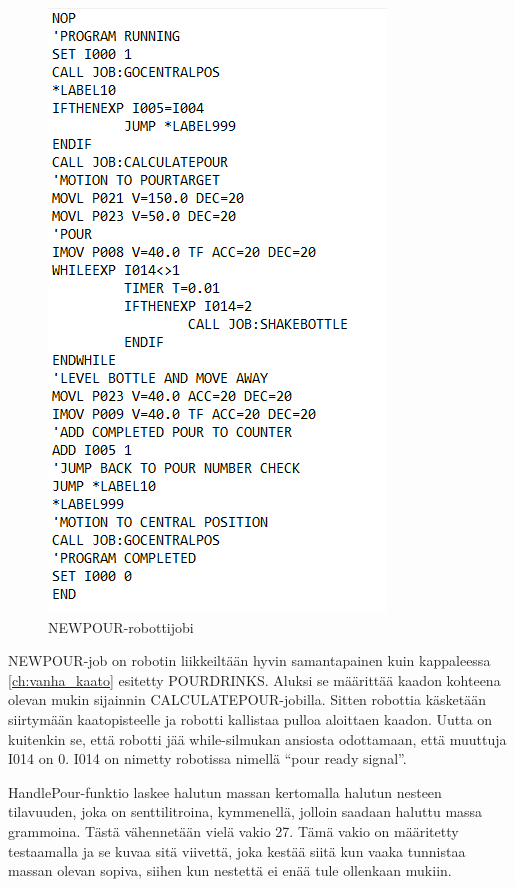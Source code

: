 \begin{figure}[h]
\begin{center}
\includegraphics[scale=0.8]{img/NEWPOUR.png}
\end{center}
\caption{NEWPOUR-robottijobi}
\label{fig:NEWPOUR}
\end{figure}

NEWPOUR-job on robotin liikkeiltään hyvin samantapainen kuin kappaleessa \ref{ch:vanha_kaato} esitetty POURDRINKS. Aluksi se määrittää kaadon kohteena olevan mukin sijainnin CALCULATEPOUR\hyp{}jobilla. Sitten robottia käsketään siirtymään kaatopisteelle ja robotti kallistaa pulloa aloittaen kaadon. Uutta on kuitenkin se, että robotti jää while-silmukan ansiosta odottamaan, että muuttuja I014 on 0. I014 on nimetty robotissa nimellä ``pour ready signal''.

HandlePour-funktio laskee halutun massan kertomalla halutun nesteen tilavuuden, joka on senttilitroina, kymmenellä, jolloin saadaan haluttu massa grammoina. Tästä vähennetään vielä vakio 27. Tämä vakio on määritetty testaamalla ja se kuvaa sitä viivettä, joka kestää siitä kun vaaka tunnistaa massan olevan sopiva, siihen kun nestettä ei enää tule ollenkaan mukiin.

